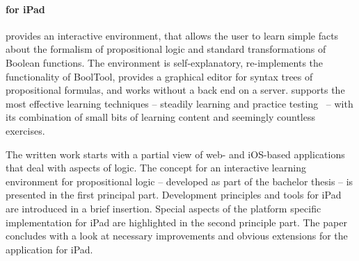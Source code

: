 \paragraph{\Nyaya for iPad}provides an interactive environment,
that allows the user to learn simple facts about the formalism of propositional logic 
and standard transformations of Boolean functions. 
The environment is self-explanatory, re-implements the functionality of  BoolTool,
provides a graphical editor for syntax trees of propositional formulas, and 
works without a back end on a server.
\Nyaya supports the most effective learning techniques – 
steadily learning and practice testing\ \cite{Dunlosky01012013} –
with its combination 
of small bits of learning content and seemingly countless exercises. 

The written work starts with a partial view of web- and iOS-based applications that deal with aspects of logic. 
The concept for an interactive learning environment for propositional logic
– developed as part of the bachelor thesis – is presented in the first principal part. 
Development principles and tools for iPad  are introduced in a brief insertion.
Special aspects of the platform specific implementation for iPad are highlighted in the second principle part. 
The paper concludes with a look at necessary improvements and obvious extensions for the application \Nyaya for iPad. 


%
